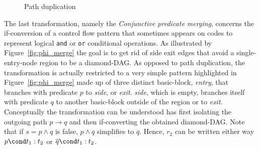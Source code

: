 \begin{figure}[h]
  \caption{\label{fig:phi_aug}Path duplication}
\end{figure}


The last transformation, namely the \emph{Conjunctive predicate merging}, concerns the if-conversion of a control flow pattern that sometimes appears on codes to represent logical \texttt{and} or \texttt{or} conditional operations. As illustrated by Figure~\ref{fig:phi_merge} the goal is to get rid of side exit edges that avoid a single-entry-node region to be a diamond-DAG. As opposed to path duplication, the transformation is actually restricted to a very simple pattern highlighted in Figure~\ref{fig:phi_merge} made up of three distinct basic-block, \textit{entry}, that branches with predicate $p$ to \textit{side}, or \textit{exit}. \textit{side}, which is empty, branches itself with predicate $q$ to another basic-block outside of the region or to \textit{exit}. Conceptually the transformation can be understood has first isolating the outgoing path $p\rightarrow q$ and then if-converting the obtained diamond-DAG. Note that if $s=p\wedge q$ is false, $p\wedge \overline{q}$ simplifies to $\overline{q}$. Hence, $r_2$ can be written either way $p\cond t_1:t_2$ or  $\overline{q}\cond t_1:t_2$. 

